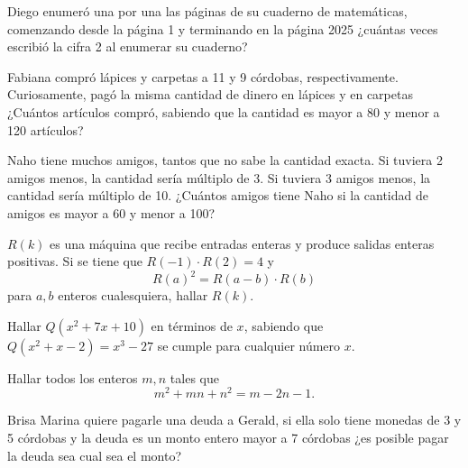 \begin{problem}
    Diego enumeró una por una las páginas de su cuaderno de matemáticas, comenzando desde la página 1 y terminando en la página 2025
    ¿cuántas veces escribió la cifra 2 al enumerar su cuaderno?
\end{problem}

\begin{problem}
    Fabiana compró lápices y carpetas a 11 y 9 córdobas, respectivamente.
    Curiosamente, pagó la misma cantidad de dinero en lápices y en carpetas
    ¿Cuántos artículos compró, sabiendo que la cantidad es mayor a 80 y menor a 120 artículos?
\end{problem}

\begin{problem}
    Naho tiene muchos amigos, tantos que no sabe la cantidad exacta.
    Si tuviera 2 amigos menos, la cantidad sería múltiplo de 3.
    Si tuviera 3 amigos menos, la cantidad sería múltiplo de 10.
    ¿Cuántos amigos tiene Naho si la cantidad de amigos es mayor a 60 y menor a 100?
\end{problem}

\begin{problem}
    $R(k)$ es una máquina que recibe entradas enteras y produce salidas enteras positivas.
    Si se tiene que $R(-1)\cdot R(2) = 4$ y
    \[
        R(a)^2 = R(a - b)\cdot R(b)
    \]
    para $a,b$ enteros cualesquiera, hallar $R(k)$.
\end{problem}

\begin{problem}
    Hallar $Q(x^2 + 7x + 10)$ en términos de $x$, sabiendo que $Q(x^2 + x - 2) = x^3 - 27$ se cumple para cualquier número $x$.
\end{problem}


\begin{problem}
    Hallar todos los enteros $m,n$ tales que
    \[
        m^2 + mn + n^2 = m - 2n - 1.
    \]
\end{problem}

\begin{problem}
    Brisa Marina quiere pagarle una deuda a Gerald, si ella solo tiene monedas de 3 y 5 córdobas y la deuda es un
    monto entero mayor a 7 córdobas ¿es posible pagar la deuda sea cual sea el monto?
\end{problem}